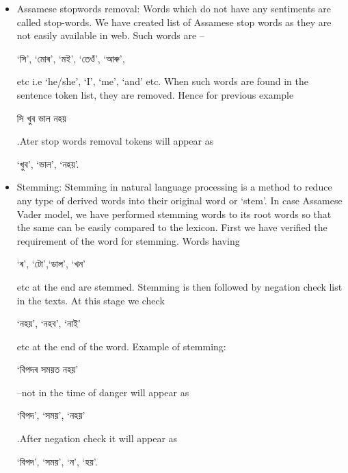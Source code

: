 \documentclass[conference]{IEEEtran}
\begin{document}
\begin{enumerate}
\begin{itemize}
                \item Assamese stopwords removal: Words which do not have any sentiments are called stop-words. We have created list of Assamese stop words as they are not easily available in web. Such words are – \begin{bengali}‘সি’, ‘মোৰ’, ‘মই’, ‘তেওঁ’, ‘আৰু’, \end{bengali} etc i.e ‘he/she’, ‘I’, ‘me’, ‘and’ etc. When such words are found in the sentence token list, they are removed. Hence for previous example \begin{bengali} সি  খুব  ভাল  নহয় \end{bengali}.Ater stop words removal tokens will appear as \begin{bengali} ‘খুব’, ‘ভাল’, ‘নহয়’.\end{bengali}
                
                \item Stemming: Stemming in natural language processing is a method to reduce any type of derived words into their original word or ‘stem’. In case Assamese Vader model, we have performed stemming words to its root words so that the same can be easily compared to the lexicon. First we have verified the requirement of the word for stemming. Words having \begin{bengali}‘ৰ’, ‘টো’,‘ডাল’, ‘খন’ \end{bengali} etc at the end are stemmed. Stemming is then followed by negation check list in the texts. At this stage we check \begin{bengali}‘নহয়’, ‘নহব’, ‘নাই’\end{bengali} etc at the end of the word. Example of stemming: \begin{bengali}‘বিপদৰ সময়ত নহয়’\end{bengali} –not in the time of danger will appear as \begin{bengali} ‘বিপদ’, ‘সময়’, ‘নহয়’\end{bengali}.After negation check it will appear as \begin{bengali} ‘বিপদ’, ‘সময়’, ‘ন’, ‘হয়’.\end{bengali}
                

\end{itemize}
\end{enumerate}
\end{document}
